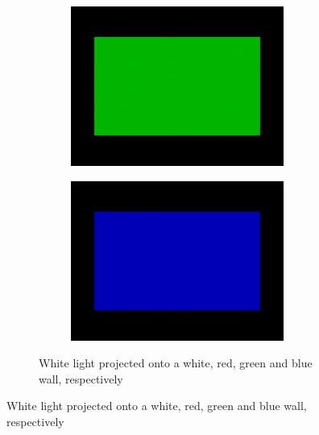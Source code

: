 \begin{figure}
\begin{subfigure}{\textwidth}
\begin{subfigure}{0.24\textwidth}
            \centering
            \includegraphics[width=\textwidth]{images/02-spd_intuition-white_green.jpg}
        \end{subfigure}
        \hfill
        \begin{subfigure}{0.24\textwidth}
            \centering
            \includegraphics[width=\textwidth]{images/02-spd_intuition-white_blue.jpg}
        \end{subfigure}
        \caption{White light projected onto a white, red, green and blue wall, respectively}
    \end{subfigure}


\end{figure}
